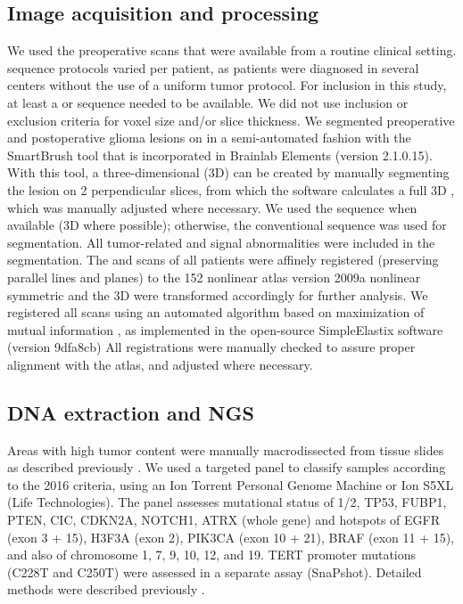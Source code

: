 \subsection{Image acquisition and processing}
We used the preoperative  scans that were available from a routine clinical setting.
 sequence protocols varied per patient, as patients were diagnosed in several centers without the use of a uniform \gls{tumor}  protocol.
For inclusion in this study, at least a  or  sequence needed to be available.
We did not use inclusion or exclusion criteria for voxel size and/or slice thickness.
We segmented preoperative and postoperative glioma lesions on  in a semi-automated fashion with the SmartBrush tool that is incorporated in Brainlab Elements (version 2.1.0.15).
With this tool, a three-dimensional (3D)  can be created by manually segmenting the lesion on 2 perpendicular slices, from which the software calculates a full 3D , which was manually adjusted where necessary.
We used the  sequence when available (3D where possible); otherwise, the conventional  sequence was used for segmentation.
All \gls{tumor}-related  and  signal abnormalities were included in the segmentation.
The  and  scans of all patients were affinely registered (preserving parallel lines and planes) to the   152 nonlinear  atlas version 2009a nonlinear symmetric \autocite{fonov2011unbiased, fonov2009unbiased} and the 3D  were transformed accordingly for further analysis.
We registered all  scans using an automated algorithm based on maximization of mutual information \autocite{klein2009adaptive}, as implemented in the open-source SimpleElastix software (version 9dfa8cb) \autocite{marstal2016simpleelastix}
All registrations were manually checked to assure proper alignment with the atlas, and adjusted where necessary.

\subsection{DNA extraction and \acrlong{NGS}}

Areas with high \gls{tumor} content were manually macrodissected from  tissue slides as described previously \autocite{wijnenga2017impact}.
We used a targeted  panel to classify samples according to the  2016 criteria, using an Ion Torrent Personal Genome Machine or Ion S5XL (Life Technologies).
The panel assesses mutational status of 1/2, TP53, FUBP1, PTEN, CIC, CDKN2A, NOTCH1, ATRX (whole gene) and hotspots of EGFR (exon 3 + 15), H3F3A (exon 2), PIK3CA (exon 10 + 21), BRAF (exon 11 + 15), and also  of chromosome 1, 7, 9, 10, 12, and 19.
TERT promoter mutations (C228T and C250T) were assessed in a separate assay (SnaPshot).
Detailed methods were described previously \autocite{wijnenga2017impact, wijnenga2018prognostic}.

